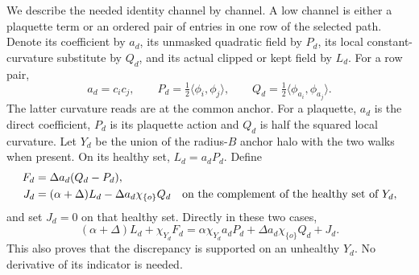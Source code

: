 We describe the needed identity channel by channel. A low channel
is either a plaquette term or an ordered pair of entries in one row
of the selected path. Denote its coefficient by $a_d$, its unmasked
quadratic field by $P_d$, its local constant-curvature substitute by
$Q_d$, and its actual clipped or kept field by $L_d$. For a row pair,
\[
 a_d=c_i c_j,\qquad
 P_d=\tfrac12\langle\phi_i,\phi_j\rangle,
 \qquad Q_d=\tfrac12\langle\phi_{a_i},\phi_{a_j}\rangle.
\]
The latter curvature reads are at the common anchor. For a plaquette,
$a_d$ is the direct coefficient, $P_d$ is its plaquette action and
$Q_d$ is half the squared local curvature. Let $Y_d$ be the union of
the radius-$B$ anchor halo with the two walks when present. On its
healthy set, $L_d=a_dP_d$. Define
\begin{align*}
 F_d&=\Delta a_d(Q_d-P_d),\\
 J_d&=(\alpha+\Delta)L_d
              -\Delta a_d\chi_{\{o\}}Q_d
                    \quad\hbox{on the complement of the healthy set of }Y_d,
\end{align*}
and set $J_d=0$ on that healthy set. Directly in these two cases,
\begin{equation}\label{eq:reset-low-identity}
 (\alpha+\Delta)L_d+\chi_{Y_d}F_d
   =\alpha\chi_{Y_d}a_dP_d
                      +\Delta a_d\chi_{\{o\}}Q_d+J_d.
\end{equation}
This also proves that the discrepancy is supported on an unhealthy
$Y_d$. No derivative of its indicator is needed.

